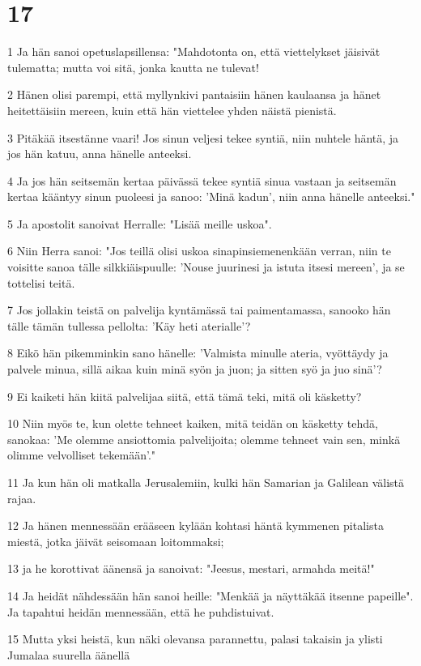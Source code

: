 \chapter{17}

\par 1 Ja hän sanoi opetuslapsillensa: "Mahdotonta on, että viettelykset jäisivät tulematta; mutta voi sitä, jonka kautta ne tulevat!
\par 2 Hänen olisi parempi, että myllynkivi pantaisiin hänen kaulaansa ja hänet heitettäisiin mereen, kuin että hän viettelee yhden näistä pienistä.
\par 3 Pitäkää itsestänne vaari! Jos sinun veljesi tekee syntiä, niin nuhtele häntä, ja jos hän katuu, anna hänelle anteeksi.
\par 4 Ja jos hän seitsemän kertaa päivässä tekee syntiä sinua vastaan ja seitsemän kertaa kääntyy sinun puoleesi ja sanoo: 'Minä kadun', niin anna hänelle anteeksi."
\par 5 Ja apostolit sanoivat Herralle: "Lisää meille uskoa".
\par 6 Niin Herra sanoi: "Jos teillä olisi uskoa sinapinsiemenenkään verran, niin te voisitte sanoa tälle silkkiäispuulle: 'Nouse juurinesi ja istuta itsesi mereen', ja se tottelisi teitä.
\par 7 Jos jollakin teistä on palvelija kyntämässä tai paimentamassa, sanooko hän tälle tämän tullessa pellolta: 'Käy heti aterialle'?
\par 8 Eikö hän pikemminkin sano hänelle: 'Valmista minulle ateria, vyöttäydy ja palvele minua, sillä aikaa kuin minä syön ja juon; ja sitten syö ja juo sinä'?
\par 9 Ei kaiketi hän kiitä palvelijaa siitä, että tämä teki, mitä oli käsketty?
\par 10 Niin myös te, kun olette tehneet kaiken, mitä teidän on käsketty tehdä, sanokaa: 'Me olemme ansiottomia palvelijoita; olemme tehneet vain sen, minkä olimme velvolliset tekemään'."
\par 11 Ja kun hän oli matkalla Jerusalemiin, kulki hän Samarian ja Galilean välistä rajaa.
\par 12 Ja hänen mennessään erääseen kylään kohtasi häntä kymmenen pitalista miestä, jotka jäivät seisomaan loitommaksi;
\par 13 ja he korottivat äänensä ja sanoivat: "Jeesus, mestari, armahda meitä!"
\par 14 Ja heidät nähdessään hän sanoi heille: "Menkää ja näyttäkää itsenne papeille". Ja tapahtui heidän mennessään, että he puhdistuivat.
\par 15 Mutta yksi heistä, kun näki olevansa parannettu, palasi takaisin ja ylisti Jumalaa suurella äänellä
